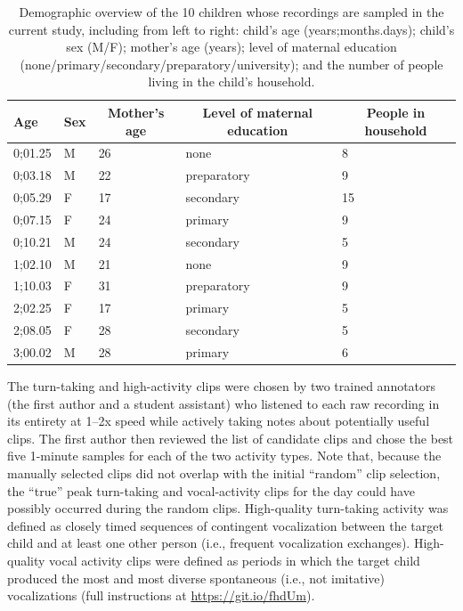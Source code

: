 \documentclass[,man,floatsintext]{apa6}
\begin{document}
\begin{table}[tbp]
\begin{center}
\begin{threeparttable}
\caption{\label{tab:tab1}Demographic overview of the 10 children whose recordings are sampled in the current study, including from left to right: child's age (years;months.days); child's sex (M/F); mother's age (years); level of maternal education (none/primary/secondary/preparatory/university); and the number of people living in the child's household.}
\begin{tabular}{lllll}
\toprule
Age & \multicolumn{1}{c}{Sex} & \multicolumn{1}{c}{Mother's age} & \multicolumn{1}{c}{Level of maternal education} & \multicolumn{1}{c}{People in household}\\
\midrule
0;01.25 & M & 26 & none & 8\\
0;03.18 & M & 22 & preparatory & 9\\
0;05.29 & F & 17 & secondary & 15\\
0;07.15 & F & 24 & primary & 9\\
0;10.21 & M & 24 & secondary & 5\\
1;02.10 & M & 21 & none & 9\\
1;10.03 & F & 31 & preparatory & 9\\
2;02.25 & F & 17 & primary & 5\\
2;08.05 & F & 28 & secondary & 5\\
3;00.02 & M & 28 & primary & 6\\
\bottomrule
\end{tabular}
\end{threeparttable}
\end{center}
\end{table}

The turn-taking and high-activity clips were chosen by two trained
annotators (the first author and a student assistant) who listened to
each raw recording in its entirety at 1--2x speed while actively taking
notes about potentially useful clips. The first author then reviewed the
list of candidate clips and chose the best five 1-minute samples for
each of the two activity types. Note that, because the manually selected
clips did not overlap with the initial \enquote{random} clip selection,
the \enquote{true} peak turn-taking and vocal-activity clips for the day
could have possibly occurred during the random clips. High-quality
turn-taking activity was defined as closely timed sequences of
contingent vocalization between the target child and at least one other
person (i.e., frequent vocalization exchanges). High-quality vocal
activity clips were defined as periods in which the target child
produced the most and most diverse spontaneous (i.e., not imitative)
vocalizations (full instructions at \url{https://git.io/fhdUm}).
\end{document}
